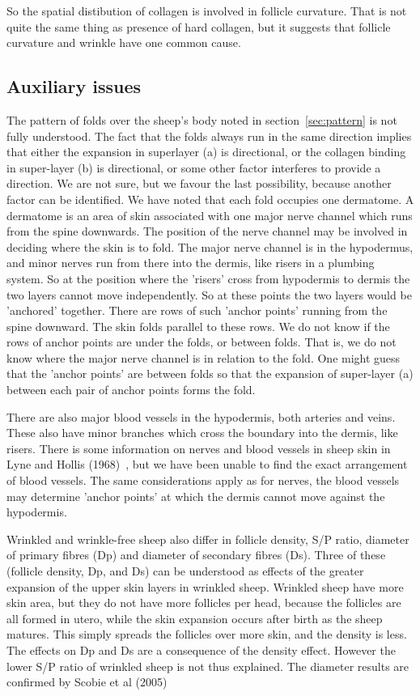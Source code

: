\documentclass[titlepage]{article}  %
\begin{document}
So the spatial distibution of collagen is involved in follicle curvature. That is not quite the same thing as presence of hard collagen, but it suggests that follicle curvature and wrinkle have one common cause.

\subsection{Auxiliary issues}
 The pattern of folds over the sheep's body noted in section~\ref{sec:pattern} is not fully understood. The fact that the folds always run in the same direction implies that either the expansion in superlayer (a) is directional, or the collagen binding in super-layer (b) is directional, or some other factor interferes to provide a direction. We are not sure, but we favour the last possibility, because another factor can be identified. We have noted that each fold occupies one dermatome. A dermatome is an area of skin associated with one major nerve channel which runs from the spine downwards. The position of the nerve channel may be involved in deciding where the skin is to fold. The major nerve channel is in the hypodermus, and minor nerves run from there into the dermis, like risers in a plumbing system. So at the position where the 'risers' cross from hypodermis to dermis the two layers cannot move independently. So at these points the two layers would be 'anchored' together. There are rows of such 'anchor points' running from the spine downward. The skin folds parallel to these rows. We do not know if the rows of anchor points are under the folds, or between folds. That is, we do not know where the major nerve channel is in relation to the fold. One might guess that the 'anchor points' are between folds so that the expansion of super-layer (a) between each pair of anchor points forms the fold.

There are also major blood vessels in the hypodermis, both arteries and veins. These also have minor branches which cross the boundary into the dermis, like risers.   There is some information on nerves and blood vessels in sheep skin in Lyne and Hollis (1968)~\cite{lyne:68}, but we have been unable to find the exact arrangement of blood vessels. The same  considerations apply as for nerves, the blood vessels may determine 'anchor points' at which the dermis cannot move against the hypodermis.

Wrinkled and wrinkle-free sheep also differ in follicle density, S/P ratio, diameter of primary fibres (Dp) and diameter of secondary fibres (Ds). Three of these (follicle density, Dp, and Ds) can be understood as effects of the greater expansion of the upper skin layers in wrinkled sheep. Wrinkled sheep have more skin area, but they do not have more follicles per head, because the follicles are all formed in utero, while the skin expansion occurs after birth as the sheep matures. This simply spreads the follicles over more skin, and the density is less. The effects on Dp and Ds are a consequence of the density effect.  However the lower S/P ratio of wrinkled sheep is not thus explained.  The diameter results are confirmed by Scobie et al (2005)~\cite{scob:05}
\end{document}
